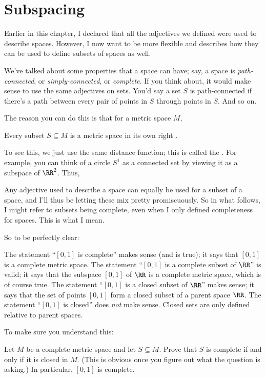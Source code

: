 \section{Subspacing}
Earlier in this chapter, I declared that all the adjectives we defined were used to describe spaces.
However, I now want to be more flexible and describes how they can be used to define subsets of spaces as well.

We've talked about some properties that a space can have;
say, a space is \emph{path-connected}, or \emph{simply-connected}, or \emph{complete}.
If you think about, it would make sense to use the same adjectives on sets.
You'd say a set $S$ is path-connected if there's a path between every pair of points in $S$
through points in $S$. And so on.

The reason you can do this is that for a metric space $M$,
\begin{moral}
	Every subset $S \subseteq M$ is a metric space in its own right .
\end{moral}
To see this, we just use the same distance function;
this is called the .
For example, you can think of a circle $S^1$ as a connected set by viewing it as a subspace of $\RR^2$.
Thus,
\begin{abuse}
	Any adjective used to describe a space can equally be used for a subset of a space,
	and I'll thus be letting these mix pretty promiscuously.
	So in what follows, I might refer to subsets being complete,
	even when I only defined completeness for spaces.
	This is what I mean.
\end{abuse}
So to be perfectly clear:
\begin{itemize}
	\ii The statement ``$[0,1]$ is complete'' makes sense (and is true);
	it says that $[0,1]$ is a complete metric space.
	\ii The statement ``$[0,1]$ is a complete subset of $\RR$'' is valid;
	it says that the subspace $[0,1]$ of $\RR$ is a complete metric space,
	which is of course true.
	\ii The statement ``$[0,1]$ is a closed subset of $\RR$'' makes sense;
	it says that the set of points $[0,1]$ form a closed subset of a parent space $\RR$.
	\ii The statement ``$[0,1]$ is closed'' does \emph{not} make sense.
	Closed sets are only defined relative to parent spaces.
\end{itemize}

To make sure you understand this:
\begin{ques}
	Let $M$ be a complete metric space and let $S \subseteq M$.
	Prove that $S$ is complete if and only if it is closed in $M$.
	(This is obvious once you figure out what the question is asking.)
	In particular, $[0,1]$ is complete.
\end{ques}

